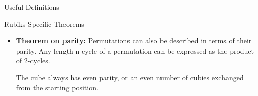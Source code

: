 \documentclass[final]{beamer}
\newlength{\colwidth}
\begin{document}
\begin{frame}[t]
\begin{columns}[t]
\begin{column}{\colwidth}
\begin{alertblock}{Useful Definitions}
\begin{itemize}
\end{itemize}






  \end{alertblock}
 
  \begin{exampleblock}{Rubiks Specific Theorems}
    \begin{itemize}

    \item\textbf{Theorem on parity:} Permutations can also be described in terms of their parity. Any length n
cycle of a permutation can be expressed as the product of 2-cycles.

The cube always has even parity, or an even number of cubies
exchanged from the starting position.


\end{itemize}
\end{exampleblock}
\end{column}
\end{columns}
\end{frame}
\end{document}
